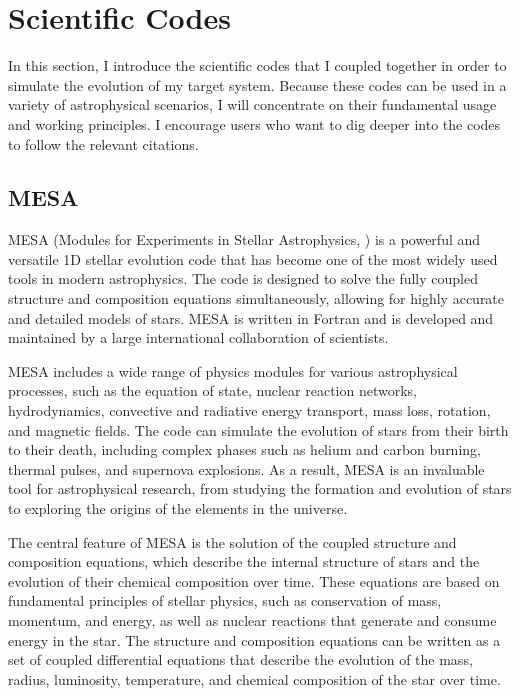 \section{Scientific Codes}

In this section, I introduce the scientific codes that I coupled together in order to simulate the evolution of my target system.  Because these codes can be used in a variety of astrophysical scenarios, I will concentrate on their fundamental usage and working principles. I encourage users who want to dig deeper into the codes to follow the relevant citations.

\subsection{MESA}

MESA (Modules for Experiments in Stellar Astrophysics, \cite{paxton2010modules,paxton2013modules,paxton2015modules,paxton2019modules}) is a powerful and versatile 1D stellar evolution code that has become one of the most widely used tools in modern astrophysics. The code is designed to solve the fully coupled structure and composition equations simultaneously, allowing for highly accurate and detailed models of stars. MESA is written in Fortran and is developed and maintained by a large international collaboration of scientists.

MESA includes a wide range of physics modules for various astrophysical processes, such as the equation of state, nuclear reaction networks, hydrodynamics, convective and radiative energy transport, mass loss, rotation, and magnetic fields. The code can simulate the evolution of stars from their birth to their death, including complex phases such as helium and carbon burning, thermal pulses, and supernova explosions. As a result, MESA is an invaluable tool for astrophysical research, from studying the formation and evolution of stars to exploring the origins of the elements in the universe.

The central feature of MESA is the solution of the coupled structure and composition equations, which describe the internal structure of stars and the evolution of their chemical composition over time. These equations are based on fundamental principles of stellar physics, such as conservation of mass, momentum, and energy, as well as nuclear reactions that generate and consume energy in the star. The structure and composition equations can be written as a set of coupled differential equations that describe the evolution of the mass, radius, luminosity, temperature, and chemical composition of the star over time.

